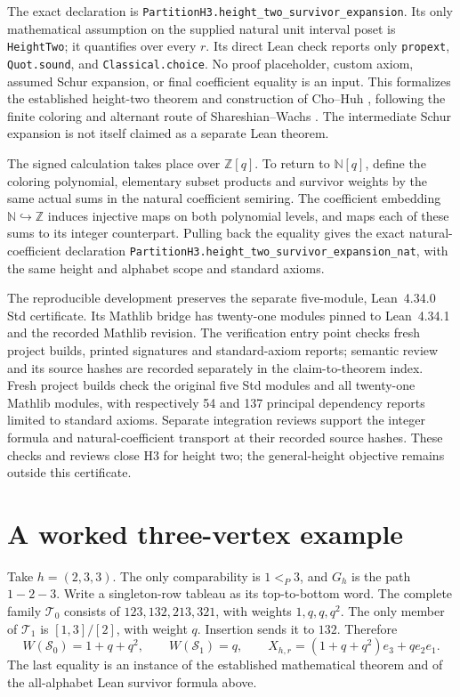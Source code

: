 \documentclass[11pt,a4paper]{article}
\theoremstyle{definition}
\begin{document}
The exact declaration is
\texttt{PartitionH3.height\_two\_survivor\_expansion}.
Its only mathematical assumption on the supplied natural unit interval
poset is \texttt{HeightTwo}; it quantifies over every $r$. Its direct Lean
check reports only \texttt{propext}, \texttt{Quot.sound}, and
\texttt{Classical.choice}. No proof placeholder, custom axiom, assumed
Schur expansion, or final coefficient equality is an input. This formalizes
the established height-two theorem and construction of Cho--Huh
\cite{chohuh}, following the finite coloring and alternant route of
Shareshian--Wachs \cite{sw}. The intermediate Schur expansion is not itself
claimed as a separate Lean theorem.

The signed calculation takes place over $\mathbb Z[q]$. To return to
$\mathbb N[q]$, define the coloring polynomial, elementary subset products
and survivor weights by the same actual sums in the natural coefficient
semiring. The coefficient embedding $\mathbb N\hookrightarrow\mathbb Z$
induces injective maps on both polynomial levels, and maps each of these
sums to its integer counterpart. Pulling back the equality gives the exact
natural-coefficient declaration
\texttt{PartitionH3.height\_two\_survivor\_expansion\_nat},
with the same height and alphabet scope and standard axioms.

The reproducible development preserves the separate five-module,
Lean~4.34.0 Std certificate. Its Mathlib bridge has twenty-one modules pinned to
Lean~4.34.1 and the recorded Mathlib revision. The verification entry point
checks fresh project builds, printed signatures and standard-axiom reports;
semantic review and its source hashes are recorded separately in the
claim-to-theorem index. Fresh project builds check the original five Std
modules and all twenty-one Mathlib modules, with respectively 54 and 137
principal dependency reports limited to standard axioms. Separate integration
reviews support the integer formula and natural-coefficient transport at
their recorded source hashes. These checks and reviews close H3 for height
two; the general-height objective remains outside this certificate.

\section{A worked three-vertex example}

Take $h=(2,3,3)$. The only comparability is $1<_P3$, and $G_h$ is the path
$1\!\! -\!\!2\!\! -\!\!3$. Write a singleton-row tableau as its top-to-bottom
word. The complete family $\mathcal T_0$ consists of
$123,132,213,321$, with weights $1,q,q,q^2$. The only member of
$\mathcal T_1$ is $[1,3]/[2]$, with weight $q$. Insertion sends it to
$132$. Therefore
\[
 W(\mathcal S_0)=1+q+q^2,\qquad W(\mathcal S_1)=q,
 \qquad X_{h,r}=(1+q+q^2)e_3+q e_2e_1.
\]
The last equality is an instance of the established mathematical theorem
and of the all-alphabet Lean survivor formula above.
\end{document}
